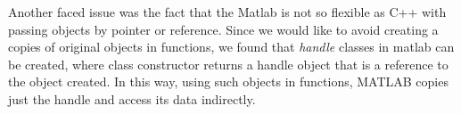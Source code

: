 \documentclass{article}
\begin{document}
Another faced issue was the fact that the Matlab is not so flexible as C++ with passing objects by pointer or reference. Since we would like to avoid creating a copies of original objects in functions, we found that \textit{handle} classes in matlab can be created, where class constructor returns a handle object that is a reference to the object created. In this way, using such objects in functions, MATLAB copies just the handle and access its data indirectly.
\end{document}
